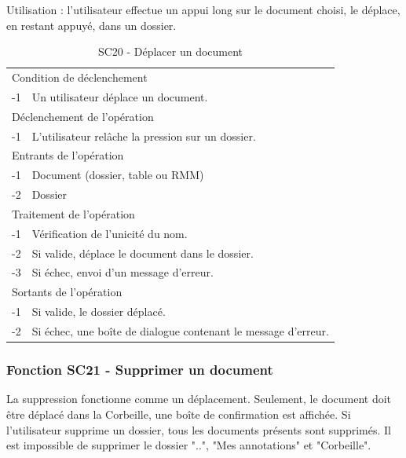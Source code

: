 \documentclass[a4paper]{article}
\begin{document}
Utilisation : l'utilisateur effectue un appui long sur le document choisi, le déplace, en restant appuyé, dans un dossier.

\begin{table}[H]
  \centering
   \small
	\begin{tabular}{|c|p{12cm}|}
   		\hline
   			\rowcolor{lightgray}\multicolumn{2}{|c|}{\textbf{SC20 - Déplacer un document}} \\
   		\hline
   			\multicolumn{2}{|l|}{Condition de d\'eclenchement} \\
   		\hline
   			-1 & Un utilisateur déplace un document.\\
   		\hline
   			\multicolumn{2}{|l|}{D\'eclenchement de l'op\'eration} \\
   		\hline
   			-1 & L'utilisateur relâche la pression sur un dossier.\\
   		\hline
   			\multicolumn{2}{|l|}{Entrants de l'op\'eration} \\
   		\hline
   			-1 & Document (dossier, table ou RMM)\\
        		-2 & Dossier\\
   		\hline
   			\multicolumn{2}{|l|}{Traitement de l'op\'eration} \\
  		\hline
   			-1 & Vérification de l'unicité du nom. \\
			-2 & Si valide, déplace le document dans le dossier. \\
			-3 & Si échec, envoi d'un message d'erreur. \\
   		\hline
   			\multicolumn{2}{|l|}{Sortants de l'op\'eration} \\
   		\hline
   			-1 & Si valide, le dossier déplacé. \\
			-2 & Si échec, une boîte de dialogue contenant le message d'erreur. \\
   		\hline
	\end{tabular}
  \caption{SC20 - Déplacer un document}
  \normalsize
  \label{tab:deplacer_document}
\end{table}

\subsubsection{Fonction SC21 - Supprimer un document}
La suppression fonctionne comme un déplacement. Seulement, le document doit être déplacé dans la Corbeille, une boîte de confirmation est affichée.
Si l'utilisateur supprime un dossier, tous les documents présents sont supprimés.
Il est impossible de supprimer le dossier "..", "Mes annotations" et "Corbeille".
\end{document}
